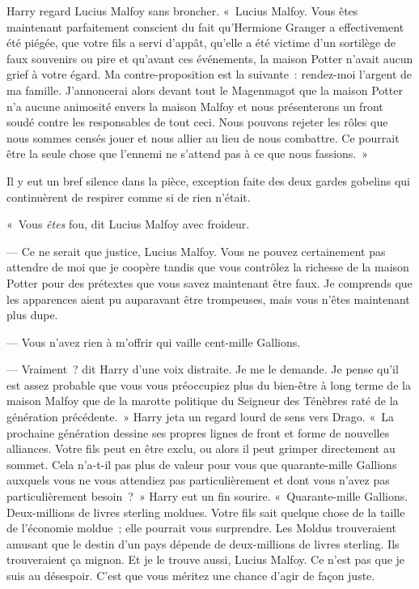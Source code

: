 Harry regard Lucius Malfoy sans broncher.
«~Lucius Malfoy.
Vous êtes maintenant parfaitement conscient du fait qu'Hermione Granger a effectivement été piégée, que votre fils a servi d'appât, qu'elle a été victime d'un sortilège de faux souvenirs ou pire et qu'avant ces événements, la maison Potter n'avait aucun grief à votre égard.
Ma contre-proposition est la suivante~: rendez-moi l'argent de ma famille.
J'annoncerai alors devant tout le Magenmagot que la maison Potter n'a aucune animosité envers la maison Malfoy et nous présenterons un front soudé contre les responsables de tout ceci.
Nous pouvons rejeter les rôles que nous sommes censés jouer et nous allier au lieu de nous combattre.
Ce pourrait être la seule chose que l'ennemi ne s'attend pas à ce que nous fassions.~»

Il y eut un bref silence dans la pièce, exception faite des deux gardes gobelins qui continuèrent de respirer comme si de rien n'était.

«~Vous \emph{êtes} fou, dit Lucius Malfoy avec froideur.

--- Ce ne serait que justice, Lucius Malfoy.
Vous ne pouvez certainement pas attendre de moi que je coopère tandis que vous contrôlez la richesse de la maison Potter pour des prétextes que vous savez maintenant être faux.
Je comprends que les apparences aient pu auparavant être trompeuses, mais vous n'êtes maintenant plus dupe.

--- Vous n'avez rien à m'offrir qui vaille cent-mille Gallions.

--- Vraiment~? dit Harry d'une voix distraite.
Je me le demande.
Je pense qu'il est assez probable que vous vous préoccupiez plus du bien-être à long terme de la maison Malfoy que de la marotte politique du Seigneur des Ténèbres raté de la génération précédente.~»
Harry jeta un regard lourd de sens vers Drago.
«~La prochaine génération dessine ses propres lignes de front et forme de nouvelles alliances.
Votre fils peut en être exclu, ou alors il peut grimper directement au sommet.
Cela n'a-t-il pas plus de valeur pour vous que quarante-mille Gallions auxquels vous ne vous attendiez pas particulièrement et dont vous n'avez pas particulièrement besoin~?~»
Harry eut un fin sourire.
«~Quarante-mille Gallions.
Deux-millions de livres sterling moldues.
Votre fils sait quelque chose de la taille de l'économie moldue~; elle pourrait vous surprendre.
Les Moldus trouveraient amusant que le destin d'un pays dépende de deux-millions de livres sterling.
Ils trouveraient ça mignon.
Et je le trouve aussi, Lucius Malfoy.
Ce n'est pas que je suis au désespoir.
C'est que vous méritez une chance d'agir de façon juste.

